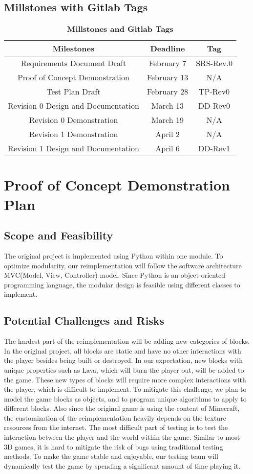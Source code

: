 \documentclass{article}
\begin{document}
\subsection{Millstones with Gitlab Tags}
\FloatBarrier
\begin{table}[hbt!]
\centering
\begin{tabular}{ |c|c|c| } \hline
\textbf{Milestones} & \textbf{Deadline} & \textbf{Tag}\\\hline
Requirements Document Draft & February 7 & SRS-Rev.0 \\\hline
Proof of Concept Demonstration & February 13 & N/A\\\hline
Test Plan Draft & February 28 & TP-Rev0 \\\hline
Revision 0 Design and Documentation & March 13 & DD-Rev0 \\\hline
Revision 0 Demonstration & March 19 & N/A \\\hline
Revision 1 Demonstration & April 2 & N/A \\\hline
Revision 1 Design and Documentation & April 6 &  DD-Rev1 \\\hline
\end{tabular}
\caption{\textbf{Millstones and Gitlab Tags}}
\end{table}
\FloatBarrier

\section{Proof of Concept Demonstration Plan}
\subsection{Scope and Feasibility}
The original project is implemented using Python within one module. To optimize modularity, our reimplementation will follow the software architecture MVC(Model, View, Controller) model. Since Python is an object-oriented programming language, the modular design is feasible using different classes to implement. 
\subsection{Potential Challenges and Risks}
The hardest part of the reimplementation will be adding new categories of blocks. In the original project, all blocks are static and have no other interactions with the player besides being built or destroyed. In our expectation, new blocks with unique properties such as Lava, which will burn the player out, will be added to the game. These new types of blocks will require more complex interactions with the player, which is difficult to implement. To mitigate this challenge, we plan to model the game blocks as objects, and to program unique algorithms to apply to different blocks. Also since the original game is using the content of Minecraft, the customization of the reimplementation heavily depends on the texture resources from the internet. The most difficult part of testing is to test the interaction between the player and the world within the game. Similar to most 3D games, it is hard to mitigate the risk of bugs using traditional testing methods. To make the game stable and enjoyable, our testing team will dynamically test the game by spending a significant amount of time playing it.
\end{document}
